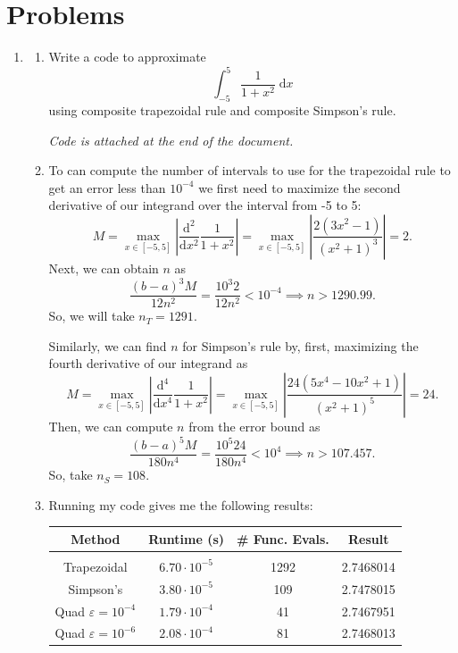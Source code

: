 \documentclass[a4paper,12pt]{article}
\newcommand{\abs}[1]{\left| #1 \right|}
\newcommand{\dd}{\mathrm{d}}
\begin{document}
\section*{Problems}
\begin{enumerate}[label = \arabic*)]
	\item 
	\begin{enumerate}[label = (\alph*)]
		\item Write a code to approximate 
		\[
			\int_{-5}^5 \frac{1}{1 + x^2} \;\dd x
		\]
		using composite trapezoidal rule and composite Simpson's rule. 
		
		\begin{center}
			\emph{Code is attached at the end of the document.}
		\end{center}
		
		\item To can compute the number of intervals to use for the trapezoidal rule to get an error less than $ 10^{-4} $ we first need to maximize the second derivative of our integrand over the interval from -5 to 5:
		\[
			M = \max_{x \in [-5,5]} \abs{\frac{\dd^2}{\dd x^2} \frac{1}{1 + x^2}} = \max_{x \in [-5,5]} \abs{\frac{2(3 x^2 - 1)}{(x^2 + 1)^3}} = 2.
		\]
		Next, we can obtain $ n $ as
		\[
			\frac{(b - a)^3 M}{12 n^2} = \frac{10^3 2}{12 n^2} < 10^{-4} \implies n > 1290.99.
		\]
		So, we will take $ n_T = 1291 $.
		
		Similarly, we can find $ n $ for Simpson's rule by, first, maximizing the fourth derivative of our integrand as
		\[
			M = \max_{x \in [-5,5]} \abs{\frac{\dd^4}{\dd x^4} \frac{1}{1 + x^2}} = \max_{x \in [-5,5]} \abs{\frac{24(5 x^4 - 10x^2 + 1)}{(x^2 + 1)^5}} = 24.
		\]
		Then, we can compute $ n $ from the error bound as
		\[
			\frac{(b - a)^5 M}{180 n^4} = \frac{10^5 24}{180 n^4} < 10^4 \implies n > 107.457.
		\]
		So, take $ n_S = 108 $.
		
		\item Running my code gives me the following results:
		\begin{table}[h!]
			\centering
			\begin{tabular}{c|ccc}
				Method & Runtime (s) & \# Func. Evals. & Result \\
				\hline \\[-2ex]
				Trapezoidal & $ 6.70 \cdot 10^{-5} $  & 1292 & 2.7468014 \\
				Simpson's    & $ 3.80 \cdot 10 ^{-5} $ & 109    & 2.7478015 \\
				Quad $ \varepsilon = 10^{-4} $ & $ 1.79 \cdot 10^{-4} $ & 41 & 2.7467951 \\
				Quad $ \varepsilon = 10^{-6} $ & $ 2.08 \cdot 10^{-4} $ & 81 & 2.7468013
			\end{tabular}
		\end{table}
	

\end{enumerate}
\end{enumerate}
\end{document}
